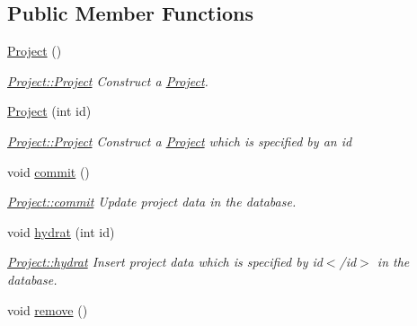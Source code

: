 \subsection*{Public Member Functions}
\begin{DoxyCompactItemize}
\item 
\hypertarget{classProject_aa007ecd17d5bc800e7a956cf666eea21}{\hyperlink{classProject_aa007ecd17d5bc800e7a956cf666eea21}{Project} ()}\label{classProject_aa007ecd17d5bc800e7a956cf666eea21}

\begin{DoxyCompactList}\small\item\em \hyperlink{classProject_aa007ecd17d5bc800e7a956cf666eea21}{Project\+::\+Project} Construct a \hyperlink{classProject}{Project}. \end{DoxyCompactList}\item 
\hyperlink{classProject_a8f608fdf1f0687598294f9534d702dd5}{Project} (int id)
\begin{DoxyCompactList}\small\item\em \hyperlink{classProject_aa007ecd17d5bc800e7a956cf666eea21}{Project\+::\+Project} Construct a \hyperlink{classProject}{Project} which is specified by an {\itshape id} \end{DoxyCompactList}\item 
\hypertarget{classProject_ab471d9354fb128c801f455e9a6bef675}{void \hyperlink{classProject_ab471d9354fb128c801f455e9a6bef675}{commit} ()}\label{classProject_ab471d9354fb128c801f455e9a6bef675}

\begin{DoxyCompactList}\small\item\em \hyperlink{classProject_ab471d9354fb128c801f455e9a6bef675}{Project\+::commit} Update project data in the database. \end{DoxyCompactList}\item 
void \hyperlink{classProject_aa966f15c9c8a277844a75c3530701525}{hydrat} (int id)
\begin{DoxyCompactList}\small\item\em \hyperlink{classProject_aa966f15c9c8a277844a75c3530701525}{Project\+::hydrat} Insert project data which is specified by {\itshape id$<$/id$>$ in the database. }\end{DoxyCompactList}\item 
\hypertarget{classProject_a7bd735a59c2fdf2718db14c3073245fc}{void \hyperlink{classProject_a7bd735a59c2fdf2718db14c3073245fc}{remove} ()}\label{classProject_a7bd735a59c2fdf2718db14c3073245fc}


\end{DoxyCompactItemize}
